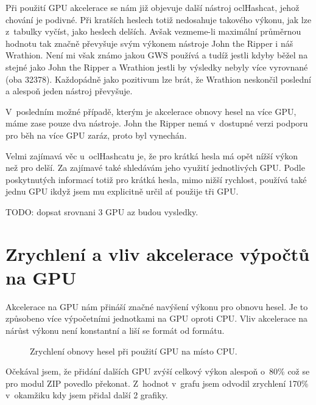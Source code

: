Při použití GPU akcelerace se nám již objevuje další nástroj oclHashcat, jehož chování je
podivné. Při kratších heslech totiž nedosahuje takového výkonu, jak lze z~tabulky vyčíst, jako
heslech delších. Avšak vezmeme-li maximální průměrnou hodnotu tak značně převyšuje svým výkonem
nástroje John the Ripper i náš Wrathion. Není mi však známo jakou GWS používá a tudíž jestli
kdyby běžel na stejné jako John the Ripper a Wrathion jestli by výsledky nebyly více vyrovnané
(oba 32378). Každopádně jako pozitivum lze brát, že Wrathion neskončil poslední a alespoň jeden
nástroj převyšuje.

V~posledním možné případě, kterým je akcelerace obnovy hesel na více GPU, máme zase pouze dva
nástroje. John the Ripper nemá v~dostupné verzi podporu pro běh na více GPU zaráz, proto byl
vynechán. 

Velmi zajímavá věc u~oclHashcatu je, že pro krátká hesla má opět nížší výkon než pro delší. Za
zajímavé také shledávám jeho využití jednotlivých GPU. Podle poskytnutých informací totiž pro
krátká hesla, mimo nižší rychlost, používá také jednu GPU ikdyž jsem mu explicitně určil ať
použije tři GPU.

TODO: dopsat srovnani 3 GPU az budou vysledky.
\section{Zrychlení a vliv akcelerace výpočtů na GPU}
\label{sec:zrychlenit}
Akcelerace na GPU nám přináší značné navýšení výkonu pro obnovu hesel. Je to způsobeno více
výpočetními jednotkami na GPU oproti CPU. Vliv akcelerace na nárůst výkonu není konstantní a liší
se formát od formátu.
\begin{center}
    \begin{figure}[ht]
	\caption{Zrychlení obnovy hesel při použití GPU na místo CPU.}
	\label{memory}
    \end{figure}
\end{center}

Očekával jsem, že přidání dalších GPU zvýší celkový výkon alespoň o~80\% což se pro modul ZIP
povedlo překonat. Z~hodnot v~grafu jsem odvodil zrychlení 170\% v~okamžiku kdy jsem přidal další
2 grafiky.


